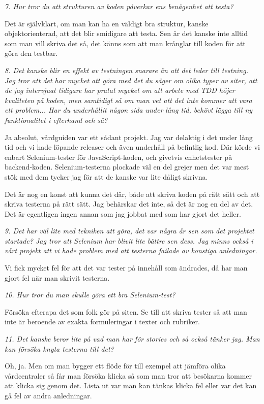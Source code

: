 \documentclass[11pt]{article}
\begin{document}
\emph{7. Hur tror du att strukturen av koden påverkar ens benägenhet att testa?}

Det är självklart, om man kan ha en väldigt bra struktur, kanske objektorienterad, att det blir smidigare att testa. Sen är det kanske inte alltid som man vill skriva det så, det känns som att man krånglar till koden för att göra den testbar.

\emph{8. Det kanske blir en effekt av testningen snarare än att det leder till testning. Jag tror att det har mycket att göra med det du säger om olika typer av siter, att de jag intervjuat tidigare har pratat mycket om att arbete med TDD höjer kvaliteten på koden, men samtidigt så om man vet att det inte kommer att vara ett problem... Har du underhållit någon sida under lång tid, behövt lägga till ny funktionalitet i efterhand och så?}

Ja absolut, vårdguiden var ett sådant projekt. Jag var delaktig i det under lång tid och vi hade löpande releaser och även underhåll på befintlig kod. Där körde vi enbart Selenium-tester för JavaScript-koden, och givetvis enhetstester på backend-koden. Selenium-testerna plockade väl en del grejer men det var mest stök med dem tycker jag för att de kanske var lite dåligt skrivna.

Det är nog en konst att kunna det där, både att skriva koden på rätt sätt och att skriva testerna på rätt sätt. Jag behärskar det inte, så det är nog en del av det. Det är egentligen ingen annan som jag jobbat med som har gjort det heller.

\emph{9. Det har väl lite med tekniken att göra, det var några år sen som det projektet startade? Jag tror att Selenium har blivit lite bättre sen dess. Jag minns också i vårt projekt att vi hade problem med att testerna failade av konstiga anledningar.}

Vi fick mycket fel för att det var tester på innehåll som ändrades, då har man gjort fel när man skrivit testerna.

\emph{10. Hur tror du man skulle göra ett bra Selenium-test?}

Försöka efterapa det som folk gör på siten. Se till att skriva tester så att man inte är beroende av exakta formuleringar i texter och rubriker.

\emph{11. Det kanske beror lite på vad man har för stories och så också tänker jag. Man kan försöka knyta testerna till det?}

Oh, ja. Men om man bygger ett flöde för till exempel att jämföra olika vårdcentraler så får man försöka klicka så som man tror att besökarna kommer att klicka sig genom det. Lista ut var man kan tänkas klicka fel eller var det kan gå fel av andra anledningar.
\end{document}
